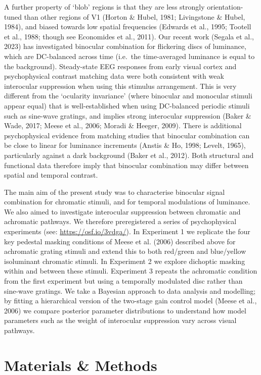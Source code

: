 \documentclass[
  letterpaper,
  DIV=11,
  numbers=noendperiod]{scrartcl}
\begin{document}
A further property of `blob' regions is that they are less strongly
orientation-tuned than other regions of V1 (Horton \& Hubel, 1981;
Livingstone \& Hubel, 1984), and biased towards low spatial frequencies
(Edwards et al., 1995; Tootell et al., 1988; though see Economides et
al., 2011). Our recent work (Segala et al., 2023) has investigated
binocular combination for flickering discs of luminance, which are
DC-balanced across time (i.e.~the time-averaged luminance is equal to
the background). Steady-state EEG responses from early visual cortex and
psychophysical contrast matching data were both consistent with weak
interocular suppression when using this stimulus arrangement. This is
very different from the `ocularity invariance' (where binocular and
monocular stimuli appear equal) that is well-established when using
DC-balanced periodic stimuli such as sine-wave gratings, and implies
strong interocular suppression (Baker \& Wade, 2017; Meese et al., 2006;
Moradi \& Heeger, 2009). There is additional psychophysical evidence
from matching studies that binocular combination can be close to linear
for luminance increments (Anstis \& Ho, 1998; Levelt, 1965),
particularly against a dark background (Baker et al., 2012). Both
structural and functional data therefore imply that binocular
combination may differ between spatial and temporal contrast.

The main aim of the present study was to characterise binocular signal
combination for chromatic stimuli, and for temporal modulations of
luminance. We also aimed to investigate interocular suppression between
chromatic and achromatic pathways. We therefore preregistered a series
of psychophysical experiments (see: \url{https://osf.io/3vdga/}). In
Experiment 1 we replicate the four key pedestal masking conditions of
Meese et al. (2006) described above for achromatic grating stimuli and
extend this to both red/green and blue/yellow isoluminant chromatic
stimuli. In Experiment 2 we explore dichoptic masking within and between
these stimuli. Experiment 3 repeats the achromatic condition from the
first experiment but using a temporally modulated disc rather than
sine-wave gratings. We take a Bayesian approach to data analysis and
modelling; by fitting a hierarchical version of the two-stage gain
control model (Meese et al., 2006) we compare posterior parameter
distributions to understand how model parameters such as the weight of
interocular suppression vary across visual pathways.

\hypertarget{materials-methods}{%
\section{Materials \& Methods}\label{materials-methods}}
\end{document}
